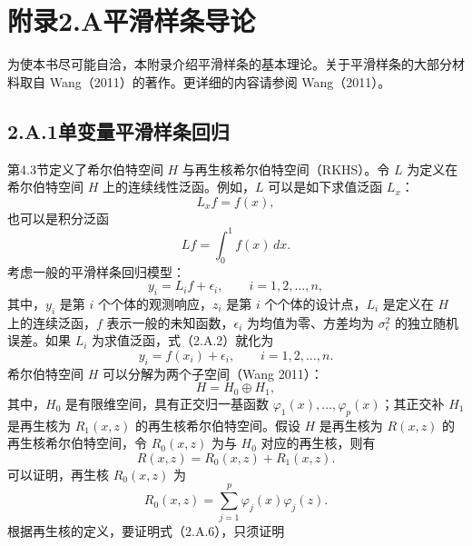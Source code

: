 \section*{附录2.A\quad 平滑样条导论}

为使本书尽可能自洽，本附录介绍平滑样条的基本理论。关于平滑样条的大部分材料取自 Wang（2011）的著作。更详细的内容请参阅 Wang（2011）。

\subsection*{2.A.1\quad 单变量平滑样条回归}

第4.3节定义了希尔伯特空间 $H$ 与再生核希尔伯特空间（RKHS）。令 $L$ 为定义在希尔伯特空间 $H$ 上的连续线性泛函。例如，$L$ 可以是如下求值泛函 $L_x$：
\begin{equation}
L_xf=f(x),\tag{2.A.1}
\end{equation}
也可以是积分泛函
\[
Lf=\int_0^1 f(x)\,dx.
\]
考虑一般的平滑样条回归模型：
\begin{equation}
y_i=L_if+\epsilon_i,\qquad i=1,2,\ldots,n,\tag{2.A.2}
\end{equation}
其中，$y_i$ 是第 $i$ 个个体的观测响应，$z_i$ 是第 $i$ 个个体的设计点，$L_i$ 是定义在 $H$ 上的连续泛函，$f$ 表示一般的未知函数，$\epsilon_i$ 为均值为零、方差均为 $\sigma_\epsilon^2$ 的独立随机误差。如果 $L_i$ 为求值泛函，式（2.A.2）就化为
\begin{equation}
y_i=f(x_i)+\epsilon_i,\qquad i=1,2,\ldots,n.\tag{2.A.3}
\end{equation}
希尔伯特空间 $H$ 可以分解为两个子空间（Wang 2011）：
\begin{equation}
H=H_0\oplus H_1,\tag{2.A.4}
\end{equation}
其中，$H_0$ 是有限维空间，具有正交归一基函数 $\varphi_1(x),\ldots,\varphi_p(x)$；其正交补 $H_1$ 是再生核为 $R_1(x,z)$ 的再生核希尔伯特空间。假设 $H$ 是再生核为 $R(x,z)$ 的再生核希尔伯特空间，令 $R_0(x,z)$ 为与 $H_0$ 对应的再生核，则有
\begin{equation}
R(x,z)=R_0(x,z)+R_1(x,z).\tag{2.A.5}
\end{equation}
可以证明，再生核 $R_0(x,z)$ 为
\begin{equation}
R_0(x,z)=\sum_{j=1}^p\varphi_j(x)\varphi_j(z).\tag{2.A.6}
\end{equation}
根据再生核的定义，要证明式（2.A.6），只须证明
